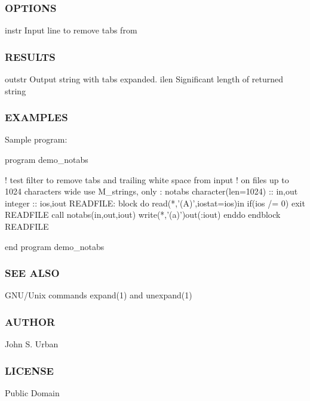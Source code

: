 \subsubsection*{O\+P\+T\+I\+O\+NS}

instr Input line to remove tabs from

\subsubsection*{R\+E\+S\+U\+L\+TS}

outstr Output string with tabs expanded. ilen Significant length of returned string

\subsubsection*{E\+X\+A\+M\+P\+L\+ES}

Sample program\+: \begin{DoxyVerb}program demo_notabs

!  test filter to remove tabs and trailing white space from input
!  on files up to 1024 characters wide
use M_strings, only : notabs
character(len=1024) :: in,out
integer             :: ios,iout
   READFILE: block
      do
         read(*,'(A)',iostat=ios)in
         if(ios /= 0) exit READFILE
         call notabs(in,out,iout)
         write(*,'(a)')out(:iout)
      enddo
   endblock READFILE

end program demo_notabs
\end{DoxyVerb}


\subsubsection*{S\+EE A\+L\+SO}

G\+N\+U/\+Unix commands expand(1) and unexpand(1)

\subsubsection*{A\+U\+T\+H\+OR}

John S. Urban \subsubsection*{L\+I\+C\+E\+N\+SE}

Public Domain \mbox{\label{namespacem__strings_a3596a4ec755ac897a1dbc0b225d5266a}} 
